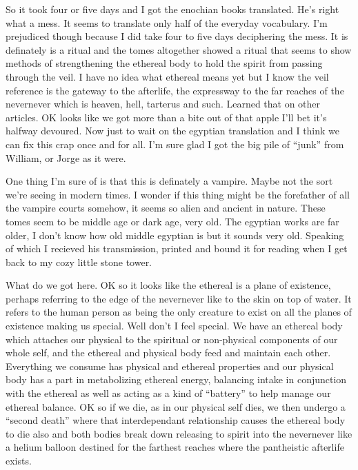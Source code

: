 So it took four or five days and I got the enochian books translated. He's right what a mess. It seems to translate only half of the everyday vocabulary. I'm prejudiced though because I did take four to five days deciphering the mess. It is definately is a ritual and the tomes altogether showed a ritual that seems to show methods of strengthening the ethereal body to hold the spirit from passing through the veil. I have no idea what ethereal means yet but I know the veil reference is the gateway to the afterlife, the expressway to the far reaches of the nevernever which is heaven, hell, tarterus and such. Learned that on other articles. OK looks like we got more than a bite out of that apple I'll bet it's halfway devoured. Now just to wait on the egyptian translation and I think we can fix this crap once and for all. I'm sure glad I got the big pile of ``junk'' from William, or Jorge as it were.

One thing I'm sure of is that this is definately a vampire. Maybe not the sort we're seeing in modern times. I wonder if this thing might be the forefather of all the vampire courts somehow, it seems so alien and ancient in nature. These tomes seem to be middle age or dark age, very old. The egyptian works are far older, I don't know how old middle egyptian is but it sounds very old. Speaking of which I recieved his transmission, printed and bound it for reading when I get back to my cozy little stone tower.

What do we got here. OK so it looks like the ethereal is a plane of existence, perhaps referring to the edge of the nevernever like to the skin on top of water. It refers to the human person as being the only creature to exist on all the planes of existence making us special. Well don't I feel special. We have an ethereal body which attaches our physical to the spiritual or non-physical components of our whole self, and the ethereal and physical body feed and maintain each other. Everything we consume has physical and ethereal properties and our physical body has a part in metabolizing ethereal energy, balancing intake in conjunction with the ethereal as well as acting as a kind of ``battery'' to help manage our ethereal balance. OK so if we die, as in our physical self dies, we then undergo a ``second death'' where that interdependant relationship causes the ethereal body to die also and both bodies break down releasing to spirit into the nevernever like a helium balloon destined for the farthest reaches where the pantheistic afterlife exists.

